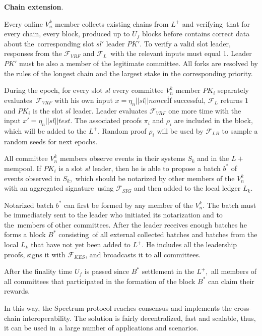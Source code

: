 \begin{legal}
    \item \textbf{Chain extension}.
    \begin{legal}

        \item Every online $V^k_n$ member collects existing chains from $L^+$ and verifying\
        that for every chain, every block, produced up to $U_f$ blocks before contains correct data about the\
        corresponding slot $sl'$ leader $PK'$.
        To verify a valid slot leader, responses from the ${\mathcal{F}}_{VRF}$ and ${\mathcal{F}}_{L}$\
        with the relevant inputs must equal $1$.
        Leader $PK'$ must be also a member of the legitimate committee.
        All forks are resolved by the rules of the longest chain and the largest stake in the corresponding priority.

        \item During the epoch, for every slot $sl$ every committee $V^k_n$ member $PK_i$ separately evaluates\
        ${\mathcal{F}}_{VRF}$ with his own input ${x = \eta_n || sl || \textit{nonce}}$\.
        If successful, ${\mathcal{F}}_{L}$ returns $1$ and $PK_i$ is the slot $sl$ leader.
        Leader evaluates ${\mathcal{F}}_{VRF}$ one more time with the input ${x' = \eta_n || sl || \textit{test}}$.
        The associated proofs $\pi_i$ and $\rho_i$ are included in the block, which will be added to the $L^+$.
        Random proof $\rho_i$ will be used by ${\mathcal{F}}_{LB}$ to sample a random seeds for next epochs.

        \item All committee $V^k_n$ members observe events in their systems $S_k$ and in the $L+$ mempool.
        If $PK_i$ is a slot $sl$ leader, then he is able to propose a batch $b^*$ of events observed in $S_k$,\
        which should be notarized by other members of the $V^k_n$ with an aggregated signature\
        using ${\mathcal{F}}_{SIG}$ and then added to the local ledger $L_k$.

        \item Notarized batch $b^*$ can first be formed by any member of the $V^k_n$.
        The batch must be immediately sent to the leader who initiated its notarization and to the\
        members of other committees.
        After the leader receives enough batches he forms a block  $B^*$ consisting\
        of all external collected batches and batches from the local $L_k$ that have not yet been added to $L^+$.
        He includes all the leadership proofs, signs it with ${\mathcal{F}}_{KES}$, and broadcasts it to all committees.

        \item After the finality time $U_f$ is passed since $B^*$ settlement in the $L^+$,\
        all members of all committees that participated in the formation of the block $B^*$ can claim their rewards.
    \end{legal}
\end{legal}

In this way, the Spectrum protocol reaches consensus and implements the cross-chain interoperability.
The solution is fairly decentralized, fast and scalable, thus, it can be used in\
a large number of applications and scenarios.